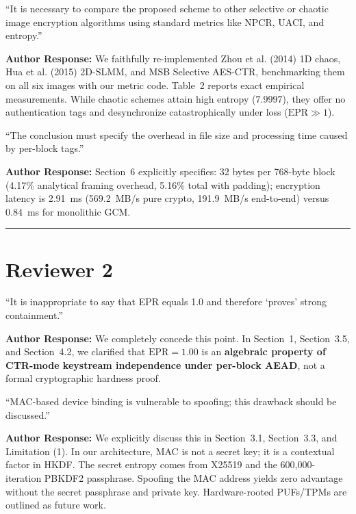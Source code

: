\documentclass[11pt,a4paper]{article}
\begin{document}
\begin{tcolorbox}[title=Comment 1.4 (Comparison with Chaotic and Selective Schemes)]
``It is necessary to compare the proposed scheme to other selective or chaotic image encryption algorithms using standard metrics like NPCR, UACI, and entropy.''
\end{tcolorbox}
\textbf{Author Response:} We faithfully re-implemented Zhou et al. (2014) 1D chaos, Hua et al. (2015) 2D-SLMM, and MSB Selective AES-CTR, benchmarking them on all six images with our metric code. Table~2 reports exact empirical measurements. While chaotic schemes attain high entropy ($7.9997$), they offer no authentication tags and desynchronize catastrophically under loss ($\text{EPR} \gg 1$).

\begin{tcolorbox}[title=Comment 1.5 (Overhead Specification in Conclusion)]
``The conclusion must specify the overhead in file size and processing time caused by per-block tags.''
\end{tcolorbox}
\textbf{Author Response:} Section~6 explicitly specifies: 32 bytes per 768-byte block (4.17\% analytical framing overhead, 5.16\% total with padding); encryption latency is 2.91~ms (569.2~MB/s pure crypto, 191.9~MB/s end-to-end) versus 0.84~ms for monolithic GCM.

\vspace{1em}
\hrule
\vspace{1em}

\section*{Reviewer 2}

\begin{tcolorbox}[title=Comment 2.1 (EPR = 1.0 Does Not ``Prove'' Containment)]
``It is inappropriate to say that EPR equals 1.0 and therefore `proves' strong containment.''
\end{tcolorbox}
\textbf{Author Response:} We completely concede this point. In Section~1, Section~3.5, and Section~4.2, we clarified that $\text{EPR} = 1.00$ is an \textbf{algebraic property of CTR-mode keystream independence under per-block AEAD}, not a formal cryptographic hardness proof.

\begin{tcolorbox}[title=Comment 2.2 (MAC Spoofing Vulnerability)]
``MAC-based device binding is vulnerable to spoofing; this drawback should be discussed.''
\end{tcolorbox}
\textbf{Author Response:} We explicitly discuss this in Section~3.1, Section~3.3, and Limitation (1). In our architecture, MAC is not a secret key; it is a contextual factor in HKDF. The secret entropy comes from X25519 and the 600,000-iteration PBKDF2 passphrase. Spoofing the MAC address yields zero advantage without the secret passphrase and private key. Hardware-rooted PUFs/TPMs are outlined as future work.
\end{document}
